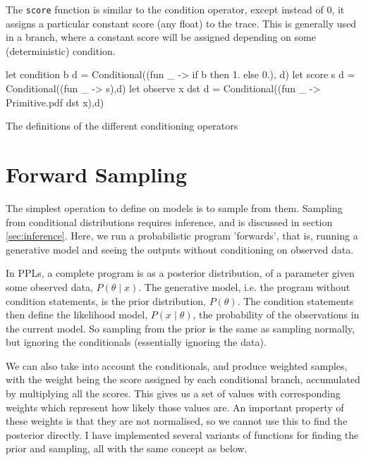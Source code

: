 The \texttt{score} function is similar to the condition operator, except instead of 0, it assigns a particular constant score (any float) to the trace. This is generally used in a branch, where a constant score will be assigned depending on some (deterministic) condition.
	
\begin{listing}[!htb]
	\centering
	\begin{ocamlcode-in}
let condition b d = Conditional((fun _ -> if b then 1. else 0.), d)
let score s d = Conditional((fun _ -> s),d)
let observe x dst d = Conditional((fun _ -> Primitive.pdf dst x),d) 
	\end{ocamlcode-in}	
	\caption{The definitions of the different conditioning operators}
	\label{lst:cond}
\end{listing}
	
\section{Forward Sampling}
The simplest operation to define on models is to sample from them. Sampling from conditional distributions requires inference, and is discussed in section \ref{sec:inference}. Here, we run a probabilistic program 'forwards', that is, running a generative model and seeing the outputs without conditioning on observed data.
		
In PPLs, a complete program is as a posterior distribution, of a parameter given some observed data, $P(\theta\mid x)$. The generative model, i.e. the program without condition statements, is the prior distribution, $P(\theta)$. The condition statements then define the likelihood model, $P(x\mid \theta)$, the probability of the observations in the current model. So sampling from the prior is the same as sampling normally, but ignoring the conditionals (essentially ignoring the data).
	
We can also take into account the conditionals, and produce weighted samples, with the weight being the score assigned by each conditional branch, accumulated by multiplying all the scores. This gives us a set of values with corresponding weights which represent how likely those values are. An important property of these weights is that they are not normalised, so we cannot use this to find the posterior directly. I have implemented several variants of functions for finding the prior and sampling, all with the same concept as below.
	

